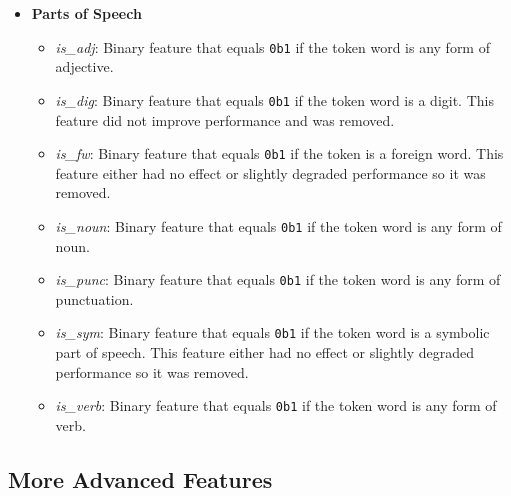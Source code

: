 \documentclass{article}
\begin{document}
\begin{itemize}
\begin{itemize}
      \end{itemize}
    \item \textbf{Parts of Speech}
      \begin{itemize}
        \item \textit{is\_adj}: Binary feature that equals \texttt{0b1} if the token word is any form of adjective.
        \item \textit{is\_dig}: Binary feature that equals \texttt{0b1} if the token word is a digit.  This feature did not improve performance and was removed.
        \item \textit{is\_fw}: Binary feature that equals \texttt{0b1} if the token is a foreign word.  This feature either had no effect or slightly degraded performance so it was removed.
        \item \textit{is\_noun}: Binary feature that equals \texttt{0b1} if the token word is any form of noun.
        \item \textit{is\_punc}: Binary feature that equals \texttt{0b1} if the token word is any form of punctuation.
        \item \textit{is\_sym}: Binary feature that equals \texttt{0b1} if the token word is a symbolic part of speech.  This feature either had no effect or slightly degraded performance so it was removed.
        \item \textit{is\_verb}: Binary feature that equals \texttt{0b1} if the token word is any form of verb.
      \end{itemize}
  \end{itemize}

  \subsection{More Advanced Features}
\end{document}

